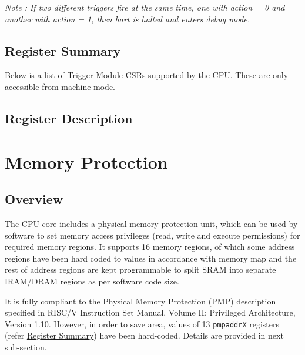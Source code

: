 \documentclass[main\_\_EN.tex]{subfiles}
\begin{document}
\textit{Note : If two different triggers fire at the same time, one with action = 0 and another with action = 1, then hart is halted and enters debug mode.}


\hypertarget{riscvcpu-hwt-reg-summ}{}
\subsection{Register Summary}
\label{sec:riscvcpu-hwt-reg-summ}


Below is a list of Trigger Module CSRs supported by the CPU. These are only accessible from machine-mode.




\subsection{Register Description}




\clearpage
\section{Memory Protection}
\label{sec:riscvcpu-pmp}

\subsection{Overview}
\label{sec:riscvcpu-pmp-overview}
The CPU core includes a physical memory protection unit, which can be used by software to set memory access privileges (read, write and execute permissions) for required memory regions. It supports 16 memory regions, of which some address regions have been hard coded to values in accordance with \chipname{} memory map and the rest of address regions are kept programmable to split SRAM into separate IRAM/DRAM regions as per software code size.

It is fully compliant to the  Physical Memory Protection (PMP) description specified in RISC\-/V Instruction Set Manual, Volume II: Privileged Architecture, Version 1.10. However, in order to save area, values of 13 \texttt{pmpaddrX} registers (refer \hyperref[sec:riscvcpu-pmp-reg-summ]{Register Summary}) have been hard-coded. Details are provided in next sub-section.
\end{document}
